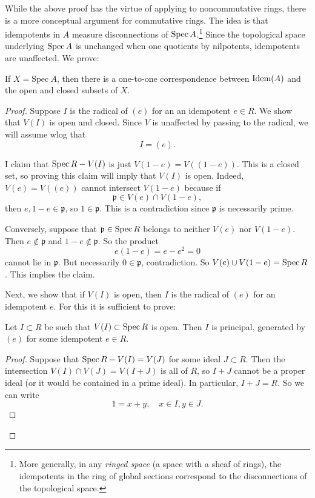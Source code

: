 While the above proof has the virtue of applying to noncommutative rings,
there is a more conceptual argument for commutative rings. The idea is that
idempotents in $A$ measure disconnections of $\operatorname{Spec} A$.\footnote{More
generally, in any \emph{ringed space} (a space with a sheaf of rings), the
idempotents in the ring of global sections correspond to the disconnections of
the topological space.} Since the topological space underlying $\operatorname{Spec} A$ is
unchanged when one quotients by nilpotents, idempotents are unaffected.
We prove:

\begin{proposition} If $X = \mathrm{Spec} \   A$, then there is a one-to-one
correspondence between $\operatorname{\text{Idem}}(A)$ and the open and closed subsets of $X$.
\end{proposition}
\begin{proof} Suppose $I$ is the radical of $(e)$ for an 
an idempotent $e \in R$. We show that $V(I)$ is open and closed. Since $V$ is
unaffected by passing to the radical, we will assume wlog that
\[ I = (e).  \]

I claim that $\operatorname{Spec} R - V(I)$ is just $V(1-e) = V((1-e))$. This is a closed
set, so proving this claim will imply that $V(I)$ is open.  Indeed,
$V(e)=V((e))$ cannot intersect $V(1-e)$ because if
\[ \mathfrak{p} \in V(e) \cap V(1-e),  \]
then $e, 1-e \in \mathfrak{p}$, so $1 \in \mathfrak{p}$. This is a
contradiction since $\mathfrak{p}$ is necessarily prime.

Conversely, suppose that $\mathfrak{p} \in \operatorname{Spec} R$ belongs to neither $V(e)$
nor $V(1-e)$. Then $e \notin \mathfrak{p}$ and $1-e \notin \mathfrak{p}$. So
the product
\[ e(1-e)  = e-e^2 = 0  \]
cannot lie in $\mathfrak{p}$. But necessarily $0 \in \mathfrak{p}$,
contradiction. So $V(e) \cup V(1-e) = \operatorname{Spec} R$. This implies the claim.

Next, we show that if $V(I)$ is open, then $I$ is the radical of $(e)$ for an
idempotent $e$. For this it is sufficient to  prove:

\begin{lemma} 
Let $I \subset R$ be such that $V(I) \subset \operatorname{Spec} R$ is open. Then $I$
is principal, generated by $(e)$ for some idempotent $e \in R$.
\end{lemma} 
\begin{proof} 
Suppose that $\operatorname{Spec} R - V(I) = V(J)$ for some ideal $J \subset R$. Then the
intersection $V(I) \cap V(J) = V(I+J)$ is all of $R$, so $I+J$ cannot be a
proper ideal (or it would be contained in a prime ideal). In particular, $I+J =
R$. So we can write
\[ 1 = x + y, \quad x \in I, y \in J.  \]


\end{proof}
\end{proof}

